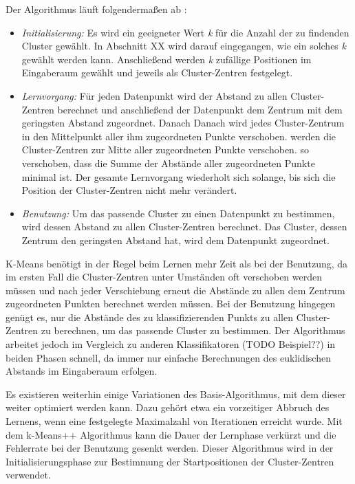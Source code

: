 Der Algorithmus läuft folgendermaßen ab \cite{Marsland}:
\begin{itemize}

\item \emph{Initialisierung:} Es wird ein geeigneter Wert \emph{k} für die Anzahl der zu findenden Cluster gewählt. In Abschnitt XX wird darauf eingegangen, wie ein solches \emph{k} gewählt werden kann. Anschließend werden \emph{k} zufällige Positionen im Eingaberaum gewählt und jeweils als Cluster-Zentren festgelegt.
\item \emph{Lernvorgang:} Für jeden Datenpunkt wird der Abstand zu allen Cluster-Zentren berechnet und anschließend der Datenpunkt dem Zentrum mit dem geringsten Abstand zugeordnet. Danach 
Danach wird jedes Cluster-Zentrum in den Mittelpunkt aller ihm zugeordneten Punkte verschoben.
werden die Cluster-Zentren 
zur Mitte aller zugeordneten Punkte verschoben.
so verschoben, dass die Summe der Abstände aller zugeordneten Punkte minimal ist. 
Der gesamte Lernvorgang wiederholt sich solange, bis sich die Position der Cluster-Zentren nicht mehr verändert. 
\item \emph{Benutzung:} Um das passende Cluster zu einen Datenpunkt zu bestimmen, wird dessen Abstand zu allen Cluster-Zentren berechnet. Das Cluster, dessen Zentrum den geringsten Abstand hat, wird dem Datenpunkt zugeordnet.
\end{itemize}

K-Means benötigt in der Regel beim Lernen mehr Zeit als bei der Benutzung, da im ersten Fall die Cluster-Zentren unter Umständen oft verschoben werden müssen und nach jeder Verschiebung erneut die Abstände zu allen dem Zentrum zugeordneten Punkten berechnet werden müssen. Bei der Benutzung hingegen genügt es, nur die Abstände des zu klassifizierenden Punkts zu allen Cluster-Zentren zu berechnen, um das passende Cluster zu bestimmen. Der Algorithmus arbeitet jedoch im Vergleich zu anderen Klassifikatoren (TODO Beispiel??) in beiden Phasen schnell, da immer nur einfache Berechnungen des euklidischen Abstands im Eingaberaum erfolgen.

Es existieren weiterhin einige Variationen des Basis-Algorithmus, mit dem dieser weiter optimiert werden kann. Dazu gehört etwa ein vorzeitiger Abbruch des Lernens, wenn eine festgelegte Maximalzahl von Iterationen erreicht wurde. Mit dem k-Means++ Algorithmus \cite{kMeans++} kann die Dauer der Lernphase verkürzt und die Fehlerrate bei der Benutzung gesenkt werden. Dieser Algorithmus wird in der Initialisierungsphase zur Bestimmung der Startpositionen der Cluster-Zentren verwendet. 




